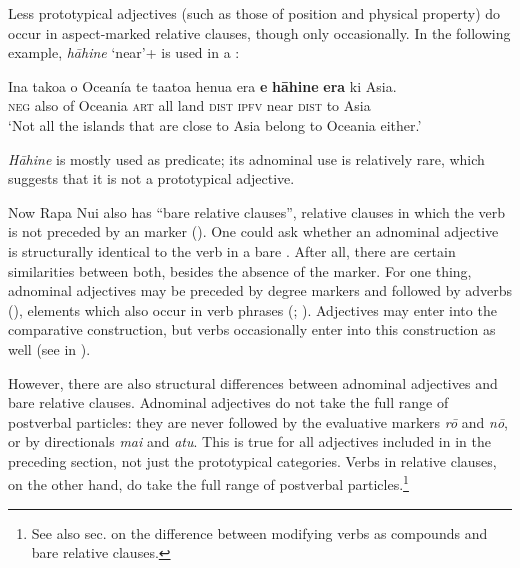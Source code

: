   
Less prototypical adjectives (such as those of position and physical property) do occur in aspect-marked relative clauses, though only occasionally. In the following example, \textit{hāhine} ‘near’+  is used in a : 

\ea\label{ex:3.97}
\gll {\ꞌ}Ina tako{\ꞌ}a o Oceanía te ta{\ꞌ}ato{\ꞌ}a henua era \textbf{e} \textbf{hāhine} \textbf{era} ki Asia.\\
\textsc{neg} also of Oceania \textsc{art} all land \textsc{dist} \textsc{ipfv} near \textsc{dist} to Asia\\

\glt
‘Not all the islands that are close to Asia belong to Oceania either.’ \textstyleExampleref{[R342.008]} 
\z

\textit{Hāhine} is mostly used as predicate; its adnominal use is relatively rare, which suggests that it is not a prototypical adjective.

Now Rapa Nui also has “bare relative clauses”, relative clauses in which the verb is not preceded by an  marker (). One could ask whether an adnominal adjective is structurally identical to the verb in a bare . After all, there are certain similarities between both, besides the absence of the  marker. For one thing, adnominal adjectives may be preceded by degree markers and followed by adverbs (), elements which also occur in verb phrases (; ). Adjectives may enter into the comparative construction, but verbs occasionally enter into this construction as well (see  in ).

However, there are also structural differences between adnominal adjectives and bare relative clauses. Adnominal adjectives do not take the full range of postverbal particles: they are never followed by the evaluative markers \textit{rō} and \textit{nō}, or by directionals \textit{mai} and \textit{atu}. This is true for all adjectives included in  in the preceding section, not just the prototypical categories. Verbs in relative clauses, on the other hand, do take the full range of postverbal particles.\footnote{\label{fn:134}See also sec.  on the difference between modifying verbs as compounds and bare relative clauses.}

